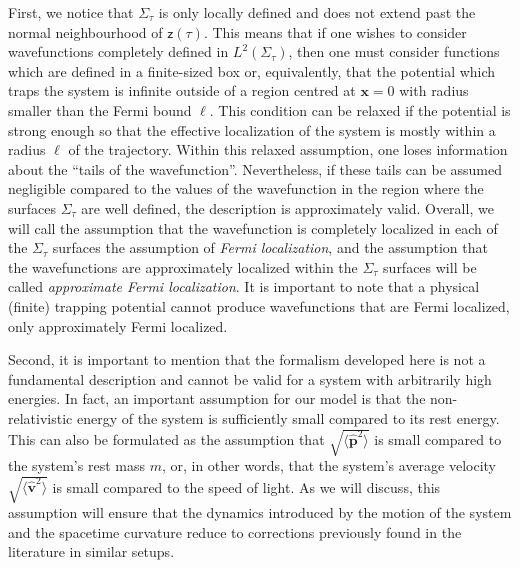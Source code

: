 \documentclass[letterpaper,12pt,titlepage,oneside,final]{book}
\newcommand{\mf}{\mathsf}%
\begin{document}
First, we notice that $\Sigma_\tau$ is only locally defined and does not extend past the normal neighbourhood of $\mf z(\tau)$. This means that if one wishes to consider wavefunctions completely defined in $L^2(\Sigma_\tau)$, then one must consider functions which are defined in a finite-sized box or, equivalently, that the potential which traps the system is infinite outside of a region centred at $\bm x = 0$ with radius smaller than the Fermi bound $\ell$. This condition can be relaxed if the potential is strong enough so that the effective localization of the system is mostly within a radius $\ell$ of the trajectory. Within this relaxed assumption, one loses information about the ``tails of the wavefunction''. Nevertheless, if these tails can be assumed negligible compared to the values of the wavefunction in the region where the surfaces $\Sigma_\tau$ are well defined, the description is approximately valid. Overall, we will call the assumption that the wavefunction is completely localized in each of the $\Sigma_\tau$ surfaces the assumption of \emph{Fermi localization}, and the assumption that the wavefunctions are approximately localized within the $\Sigma_\tau$ surfaces will be called \emph{approximate Fermi localization}. It is important to note that a physical (finite) trapping potential cannot produce wavefunctions that are Fermi localized, only approximately Fermi localized.

Second, it is important to mention that the formalism developed here is not a fundamental description and cannot be valid for a system with arbitrarily high energies. In fact, an important assumption for our model is that the non-relativistic energy of the system is sufficiently small compared to its rest energy. This can also be formulated as the assumption that $\sqrt{\langle \hat{\bm p}^2\rangle}$ is small compared to the system's rest mass $m$, or, in other words, that the system's average velocity $\sqrt{\langle\hat{\bm v}^2\rangle}$ is small compared to the speed of light. As we will discuss, this assumption will ensure that the dynamics introduced by the motion of the system and the spacetime curvature reduce to corrections previously found in the literature in similar setups.
\end{document}
